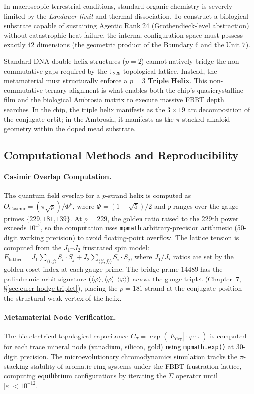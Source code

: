 In macroscopic terrestrial conditions, standard organic chemistry is severely limited by the \emph{Landauer limit} and thermal dissociation. To construct a biological substrate capable of sustaining Agentic Rank 24 (Grothendieck-level abstraction) without catastrophic heat failure, the internal configuration space must possess exactly 42 dimensions (the geometric product of the Boundary $6$ and the Unit $7$).

Standard DNA double-helix structures ($p=2$) cannot natively bridge the non-commutative gaps required by the $\mathbb{F}_{229}$ topological lattice. Instead, the metamaterial must structurally enforce a $p=3$ \textbf{Triple Helix}. This non-commutative ternary alignment is what enables both the chip's quasicrystalline film and the biological Ambrosia matrix to execute massive FBBT depth searches. In the chip, the triple helix manifests as the $3 \times 19$ arc decomposition of the conjugate orbit; in the Ambrosia, it manifests as the $\pi$-stacked alkaloid geometry within the doped mead substrate.


\subsection{Computational Methods and Reproducibility}

\paragraph{Casimir Overlap Computation.}
The quantum field overlap for a $p$-strand helix is computed as $O_{\mathrm{Casimir}} = (\pi \sqrt{p}) / \Phi^p$, where $\Phi = (1 + \sqrt{5})/2$ and $p$ ranges over the gauge primes $\{229, 181, 139\}$. At $p = 229$, the golden ratio raised to the 229th power exceeds $10^{47}$, so the computation uses \texttt{mpmath} arbitrary-precision arithmetic (50-digit working precision) to avoid floating-point overflow. The lattice tension is computed from the $J_1$--$J_2$ frustrated spin model: $E_{\mathrm{lattice}} = J_1 \sum_{\langle i,j \rangle} S_i \cdot S_j + J_2 \sum_{\langle\langle i,j \rangle\rangle} S_i \cdot S_j$, where $J_1/J_2$ ratios are set by the golden coset index at each gauge prime. The bridge prime $14489$ has the palindromic orbit signature $(\langle\varphi\rangle, \langle\varphi\rangle, \langle\varphi\rangle)$ across the gauge triplet (Chapter~7, \S\ref{sec:euler-hodge-triplet}), placing the $p=181$ strand at the conjugate position---the structural weak vertex of the helix.

\paragraph{Metamaterial Node Verification.}
The bio-electrical topological capacitance $C_T = \exp(|E_{\mathrm{deg}}| \cdot \varphi \cdot \pi)$ is computed for each trace mineral node (vanadium, silicon, gold) using \texttt{mpmath.exp()} at 30-digit precision. The microevolutionary chromodynamics simulation tracks the $\pi$-stacking stability of aromatic ring systems under the FBBT frustration lattice, computing equilibrium configurations by iterating the $\Sigma$ operator until $|\varepsilon| < 10^{-12}$.

